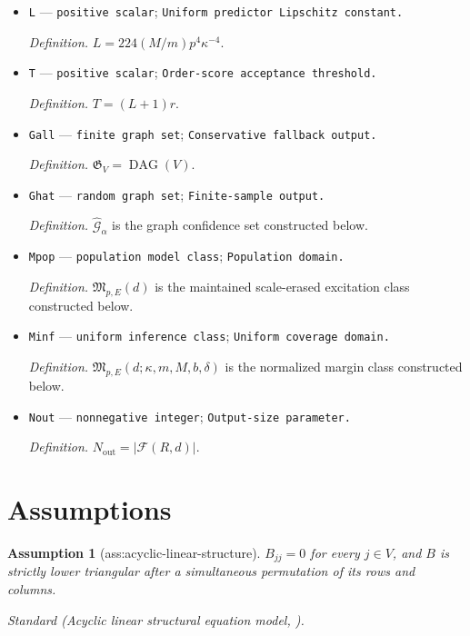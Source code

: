 \documentclass{article}
\newtheorem{assumption}{Assumption}
\begin{document}
\begin{itemize}
  \par\smallskip\noindent\emph{Definition.} \(K_B=8p^2\kappa^{-2}\).
  \item \texttt{L} --- \texttt{positive scalar}; \texttt{Uniform predictor Lipschitz constant.}
  \par\smallskip\noindent\emph{Definition.} \(L=224(M/m)p^4\kappa^{-4}\).
  \item \texttt{T} --- \texttt{positive scalar}; \texttt{Order-\allowbreak{}score acceptance threshold.}
  \par\smallskip\noindent\emph{Definition.} \(T=(L+1)r\).
  \item \texttt{Gall} --- \texttt{finite graph set}; \texttt{Conservative fallback output.}
  \par\smallskip\noindent\emph{Definition.} \(\mathfrak G_V=\operatorname{DAG}(V)\).
  \item \texttt{Ghat} --- \texttt{random graph set}; \texttt{Finite-\allowbreak{}sample output.}
  \par\smallskip\noindent\emph{Definition.} \(\widehat{\mathcal G}_{\alpha}\) is the graph confidence set constructed below.
  \item \texttt{Mpop} --- \texttt{population model class}; \texttt{Population domain.}
  \par\smallskip\noindent\emph{Definition.} \(\mathfrak M_{p,E}(d)\) is the maintained scale-erased excitation class constructed below.
  \item \texttt{Minf} --- \texttt{uniform inference class}; \texttt{Uniform coverage domain.}
  \par\smallskip\noindent\emph{Definition.} \(\mathfrak M_{p,E}(d;\kappa,m,M,b,\delta)\) is the normalized margin class constructed below.
  \item \texttt{Nout} --- \texttt{nonnegative integer}; \texttt{Output-\allowbreak{}size parameter.}
  \par\smallskip\noindent\emph{Definition.} \(N_{\mathrm{out}}=|\mathcal F(R,d)|\).
\end{itemize}

\section{Assumptions}

\begin{assumption}[ass:acyclic-linear-structure]\label{ass:acyclic-linear-structure}
\(B_{jj}=0\) for every \(j\in V\), and \(B\) is strictly lower triangular after a simultaneous permutation of its rows and columns.
\par\smallskip\noindent\emph{Standard} (Acyclic linear structural equation model, \cite{PetersBuhlmann2014EqualVariance}).
\end{assumption}
\end{document}

